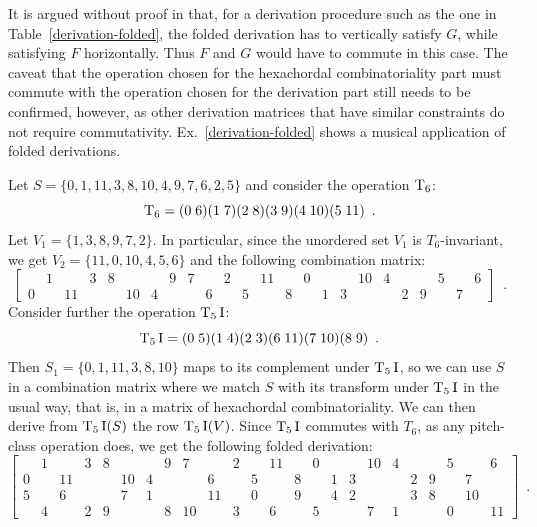 It is argued without proof in \cite[215]{Starr1984} that, for a derivation procedure such as the one in Table~\ref{derivation-folded}, the folded derivation has to vertically satisfy $G$, while satisfying $F$ horizontally. Thus $F$ and $G$ would have to commute in this case. The caveat that the operation chosen for the hexachordal combinatoriality part must commute with the operation chosen for the derivation part still needs to be confirmed, however, as other derivation matrices that have similar constraints do not require commutativity. Ex.~\ref{derivation-folded} shows a musical application of folded derivations.

\begin{example}
    \cite[215]{Starr1984}
    \label{ex:derivation-folded}
    Let $S = \{ 0, 1, 11, 3, 8, 10, 4, 9, 7, 6, 2, 5 \}$ and consider the operation $\operatorname{T}_6$:
    \begin{equation}
        \operatorname{T}_6 = (0 \; 6) (1 \; 7) (2 \; 8) (3 \; 9) (4 \; 10) (5 \; 11) \enspace.
    \end{equation}
    Let $V_1 = \{ 1, 3, 8, 9, 7, 2 \}$. In particular, since the unordered set $V_1$ is $T_6$-invariant, we get $V_2 = \{ 11, 0, 10, 4, 5, 6 \}$ and the following combination matrix:
    \begin{equation}
        \left[
        \begin{array}{cccccccccccc|cccccccccccc}
            & 1 && 3 & 8 &&& 9 & 7 && 2 && 11 && 0 &&& 10 & 4 &&& 5 && 6 \\
            0 && 11 &&& 10 & 4 &&& 6 && 5 && 8 && 1 & 3 &&& 2 & 9 && 7 &  
        \end{array}
        \right] \enspace.
    \end{equation}
    Consider further the operation $\operatorname{T}_5\operatorname{I}$:
    \begin{equation}
        \operatorname{T}_5\operatorname{I} = (0 \; 5) (1 \; 4) (2 \; 3) (6 \; 11) (7 \; 10) (8 \; 9) \enspace.
    \end{equation}
    Then $S_1 = \{ 0, 1, 11, 3, 8, 10 \}$ maps to its complement under $\operatorname{T}_5\operatorname{I}$, so we can use $S$ in a combination matrix where we match $S$ with its transform under $\operatorname{T}_5\operatorname{I}$ in the usual way, that is, in a matrix of hexachordal combinatoriality. We can then derive from $\operatorname{T}_5\operatorname{I}(S)$ the row $\operatorname{T}_5\operatorname{I}(V)$. Since $\operatorname{T}_5\operatorname{I}$ commutes with $T_6$, as any pitch-class operation does, we get the following folded derivation:
    \begin{equation}
        \left[
        \begin{array}{cccccccccccc|cccccccccccc}
            & 1 && 3 & 8 &&& 9 & 7 && 2 && 11 && 0 &&& 10 & 4 &&& 5 && 6 \\
            0 && 11 &&& 10 & 4 &&& 6 && 5 && 8 && 1 & 3 &&& 2 & 9 && 7 & \\
            \hline
            5 && 6 &&& 7 & 1 &&& 11 && 0 && 9 && 4 & 2 &&& 3 & 8 && 10 & \\
            & 4 && 2 & 9 &&& 8 & 10 && 3 && 6 && 5 &&& 7 & 1 &&& 0 && 11
        \end{array}
        \right] \enspace.
    \end{equation}
\end{example}

